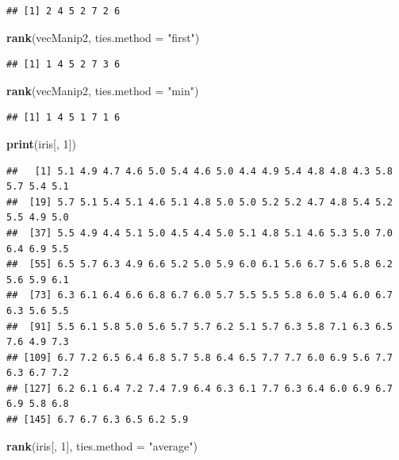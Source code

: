 \documentclass[
]{book}
\newenvironment{Shaded}{\begin{snugshade}}{\end{snugshade}}
\newcommand{\DataTypeTok}[1]{\textcolor[rgb]{0.13,0.29,0.53}{#1}}
\newcommand{\DecValTok}[1]{\textcolor[rgb]{0.00,0.00,0.81}{#1}}
\newcommand{\KeywordTok}[1]{\textcolor[rgb]{0.13,0.29,0.53}{\textbf{#1}}}
\newcommand{\NormalTok}[1]{#1}
\newcommand{\StringTok}[1]{\textcolor[rgb]{0.31,0.60,0.02}{#1}}
\begin{document}
\begin{verbatim}
## [1] 2 4 5 2 7 2 6
\end{verbatim}

\begin{Shaded}
\begin{Highlighting}[]
\KeywordTok{rank}\NormalTok{(vecManip2, }\DataTypeTok{ties.method =} \StringTok{"first"}\NormalTok{)}
\end{Highlighting}
\end{Shaded}

\begin{verbatim}
## [1] 1 4 5 2 7 3 6
\end{verbatim}

\begin{Shaded}
\begin{Highlighting}[]
\KeywordTok{rank}\NormalTok{(vecManip2, }\DataTypeTok{ties.method =} \StringTok{"min"}\NormalTok{)}
\end{Highlighting}
\end{Shaded}

\begin{verbatim}
## [1] 1 4 5 1 7 1 6
\end{verbatim}

\begin{Shaded}
\begin{Highlighting}[]
\KeywordTok{print}\NormalTok{(iris[, }\DecValTok{1}\NormalTok{])}
\end{Highlighting}
\end{Shaded}

\begin{verbatim}
##   [1] 5.1 4.9 4.7 4.6 5.0 5.4 4.6 5.0 4.4 4.9 5.4 4.8 4.8 4.3 5.8 5.7 5.4 5.1
##  [19] 5.7 5.1 5.4 5.1 4.6 5.1 4.8 5.0 5.0 5.2 5.2 4.7 4.8 5.4 5.2 5.5 4.9 5.0
##  [37] 5.5 4.9 4.4 5.1 5.0 4.5 4.4 5.0 5.1 4.8 5.1 4.6 5.3 5.0 7.0 6.4 6.9 5.5
##  [55] 6.5 5.7 6.3 4.9 6.6 5.2 5.0 5.9 6.0 6.1 5.6 6.7 5.6 5.8 6.2 5.6 5.9 6.1
##  [73] 6.3 6.1 6.4 6.6 6.8 6.7 6.0 5.7 5.5 5.5 5.8 6.0 5.4 6.0 6.7 6.3 5.6 5.5
##  [91] 5.5 6.1 5.8 5.0 5.6 5.7 5.7 6.2 5.1 5.7 6.3 5.8 7.1 6.3 6.5 7.6 4.9 7.3
## [109] 6.7 7.2 6.5 6.4 6.8 5.7 5.8 6.4 6.5 7.7 7.7 6.0 6.9 5.6 7.7 6.3 6.7 7.2
## [127] 6.2 6.1 6.4 7.2 7.4 7.9 6.4 6.3 6.1 7.7 6.3 6.4 6.0 6.9 6.7 6.9 5.8 6.8
## [145] 6.7 6.7 6.3 6.5 6.2 5.9
\end{verbatim}

\begin{Shaded}
\begin{Highlighting}[]
\KeywordTok{rank}\NormalTok{(iris[, }\DecValTok{1}\NormalTok{], }\DataTypeTok{ties.method =} \StringTok{"average"}\NormalTok{)}
\end{Highlighting}
\end{Shaded}
\end{document}
